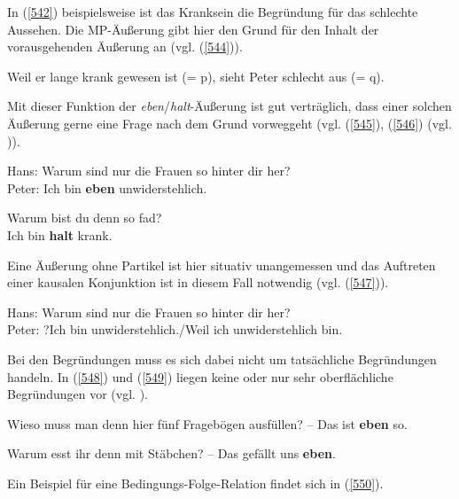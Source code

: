 In (\ref{542}) beispielsweise ist das Kranksein die Begründung für das schlechte Aussehen. Die MP-Äußerung gibt hier den Grund für den Inhalt der vorausgehenden Äußerung an (vgl. (\ref{544})).

\begin{exe}
	\ex\label{544} Weil er lange krank gewesen ist (= p), sieht Peter schlecht aus (= q).		
\end{exe}
Mit dieser Funktion der \textit{eben}/\textit{halt}-Äußerung ist gut verträglich, dass einer solchen Äußerung gerne eine Frage nach dem Grund vorweggeht (vgl. (\ref{545}), (\ref{546}) (vgl. \citealt[121]{Thurmair1989})).
\begin{exe}
	\ex\label{545} 
	Hans: Warum sind nur die Frauen so hinter dir her?\\
	Peter: Ich bin \textbf{eben} unwiderstehlich.
	\hfill\hbox{\citet[121]{Thurmair1989}} 	
\end{exe}	

\begin{exe}
	\ex\label{546} 
	Warum bist du denn so fad?\\
	Ich bin \textbf{halt} krank.	
	\hfill\hbox{\citet[312]{Schlieben-Lange1979}} 	
\end{exe}	
Eine Äußerung ohne Partikel ist hier situativ unangemessen und das Auftreten einer kausalen Konjunktion ist in diesem Fall notwendig (vgl. (\ref{547})).

\begin{exe}
	\ex\label{547} 
	Hans: Warum sind nur die Frauen so hinter dir her?\\
	Peter: ?Ich bin unwiderstehlich./Weil ich unwiderstehlich bin.	
	\newline
	\hbox{}\hfill\hbox{\citet[121]{Thurmair1989}} 	
\end{exe}
Bei den \glq Begründungen\grq {} muss es sich dabei nicht um tatsächliche Begründungen handeln. In (\ref{548}) und (\ref{549}) liegen keine oder nur sehr oberflächliche Begründungen vor (vgl. \citealt[322]{Troemel-Ploetz1979}).

\begin{exe}
	\ex\label{548} 
	Wieso muss man denn hier fünf Fragebögen ausfüllen? – Das ist \textbf{eben} so.	
	\newline
	\hbox{}\hfill\hbox{\citet[312]{Schlieben-Lange1979}} 	
\end{exe}	
\begin{exe}
	\ex\label{549} 
	Warum esst ihr denn mit Stäbchen? – Das gefällt uns \textbf{eben}.
	\newline
	\hbox{}\hfill\hbox{\citet[322]{Troemel-Ploetz1979}} 	
\end{exe}																	              
Ein Beispiel für eine Bedingungs-Folge-Relation findet sich in (\ref{550}).

